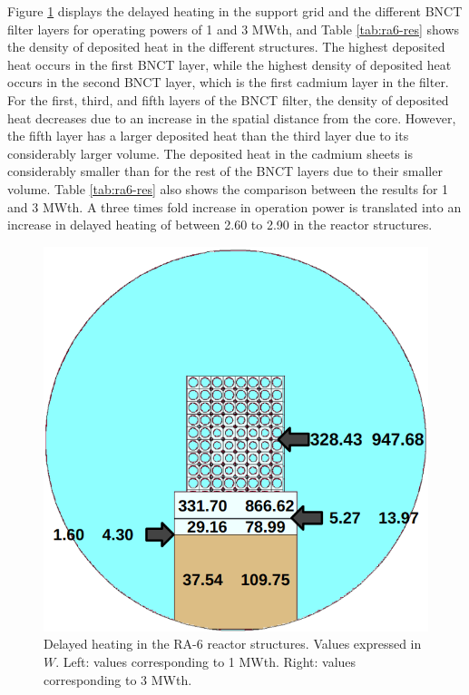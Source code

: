 \documentclass{style/nseJournal}
\begin{document}
Figure \ref{fig:ra6-3} displays the delayed heating in the support grid and the different BNCT filter layers for operating powers of 1 and 3 MWth, and Table \ref{tab:ra6-res} shows the density of deposited heat in the different structures.
The highest deposited heat occurs in the first BNCT layer, while the highest density of deposited heat occurs in the second BNCT layer, which is the first cadmium layer in the filter.
For the first, third, and fifth layers of the BNCT filter, the density of deposited heat decreases due to an increase in the spatial distance from the core.
However, the fifth layer has a larger deposited heat than the third layer due to its considerably larger volume.
The deposited heat in the cadmium sheets is considerably smaller than for the rest of the BNCT layers due to their smaller volume.
Table \ref{tab:ra6-res} also shows the comparison between the results for 1 and 3 MWth.
A three times fold increase in operation power is translated into an increase in delayed heating of between 2.60 to 2.90 in the reactor structures.

\begin{figure}[htbp!] %
    \centering
    \includegraphics[width=0.80\linewidth]{figures/results_b}
    \hfill
    \caption{Delayed heating in the RA-6 reactor structures. Values expressed in $W$. Left: values corresponding to 1 MWth. Right: values corresponding to 3 MWth.}
    \label{fig:ra6-3}
\end{figure}
\end{document}
